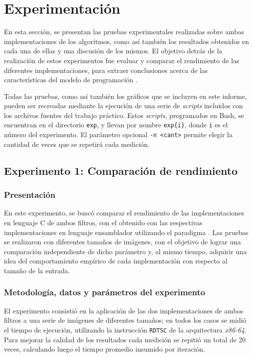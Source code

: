 \section{Experimentación}
    En esta sección, se presentan las pruebas experimentales realizadas sobre ambas implementaciones de los algoritmos, como así también los resultados obtenidos en cada una de ellas y una discusión de los mismos. El objetivo detrás de la realización de estos experimentos fue evaluar y comparar el rendimiento de las diferentes implementaciones, para extraer conclusiones acerca de las características del modelo de programación .

    Todas las pruebas, como así también los gráficos que se incluyen en este informe, pueden ser recreadas mediante la ejecución de una serie de \emph{scripts} incluidos con los archivos fuentes del trabajo práctico. Estos \emph{scripts}, programados en Bash, se encuentran en el directorio \texttt{exp}, y llevan por nombre \texttt{exp\{i\}}, donde \texttt{i} es el número del experimento. El parámetro opcional \texttt{-n <cant>} permite elegir la cantidad de veces que se repetirá cada medición.

    \subsection{Experimento 1: Comparación de rendimiento}

        \subsubsection*{Presentación}
        	En este experimento, se buscó comparar el rendimiento de las implementaciones en lenguaje C de ambos filtros, con el obtenido con las respectivas implementaciones en lenguaje ensamblador utilizando el paradigma . Las pruebas se realizaron con diferentes tamaños de imágenes, con el objetivo de lograr una comparación independiente de dicho parámetro y, al mismo tiempo, adquirir una idea del comportamiento empírico de cada implementación con respecto al tamaño de la entrada.

        \subsubsection*{Metodología, datos y parámetros del experimento}
        	El experimento consistió en la aplicación de las dos implementaciones de ambos filtros a una serie de imágenes de diferentes tamaños; en todos los casos se midió el tiempo de ejecución, utilizando la instrucción \texttt{RDTSC} de la arquitectura \emph{x86-64}. Para mejorar la calidad de los resultados cada medición se repitió un total de 20 veces, calculando luego el tiempo promedio insumido por iteración.

